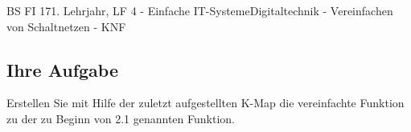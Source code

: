 \documentclass[11pt,twocolumn,oneside,openany,headings=optiontotoc,11pt,numbers=noenddot]{article}
\begin{document}
\begin{worksheet}{BS FI 17}{1. Lehrjahr, LF 4 - Einfache IT-Systeme}{Digitaltechnik - Vereinfachen von Schaltnetzen - KNF}
		\subsection*{Ihre Aufgabe} Erstellen Sie mit Hilfe der zuletzt aufgestellten K-Map die vereinfachte Funktion zu der zu Beginn von 2.1 genannten Funktion.\\
	\end{worksheet}
\end{document}
